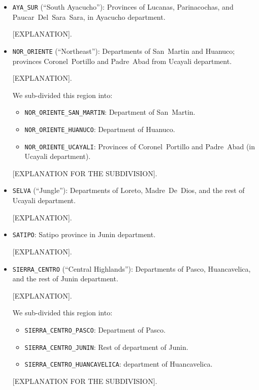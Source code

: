 \documentclass[class=article, crop=false]{standalone}
\begin{document}
\begin{itemize}
    [EXPLANATION].

  \item \texttt{AYA\_SUR} (``South Ayacucho''): Provinces of Lucanas, Parinacochas, and Paucar~Del~Sara~Sara, in Ayacucho department.

    [EXPLANATION].

  \item \texttt{NOR\_ORIENTE} (``Northeast''): Departments of San~Martin and Huanuco; provinces Coronel~Portillo and Padre~Abad from Ucayali department.

    [EXPLANATION].

    We sub-divided this region into:
    \begin{itemize}
      \item \texttt{NOR\_ORIENTE\_SAN\_MARTIN}: Department of San~Martin.
      \item \texttt{NOR\_ORIENTE\_HUANUCO}: Department of Huanuco.
      \item \texttt{NOR\_ORIENTE\_UCAYALI}: Provinces of Coronel~Portillo and Padre~Abad (in Ucayali department).
    \end{itemize}

    [EXPLANATION FOR THE SUBDIVISION].


  \item \texttt{SELVA} (``Jungle''): Departments of Loreto, Madre~De~Dios, and the rest of Ucayali department.

    [EXPLANATION].

  \item \texttt{SATIPO}: Satipo province in Junin department.

    [EXPLANATION].

  \item \texttt{SIERRA\_CENTRO} (``Central Highlands''): Departments of Pasco, Huancavelica, and the rest of Junin department.

    [EXPLANATION].

    We sub-divided this region into:
    \begin{itemize}
      \item \texttt{SIERRA\_CENTRO\_PASCO}: Department of Pasco.
      \item \texttt{SIERRA\_CENTRO\_JUNIN}: Rest of department of Junin.
      \item \texttt{SIERRA\_CENTRO\_HUANCAVELICA}: department of Huancavelica.
    \end{itemize}

    [EXPLANATION FOR THE SUBDIVISION].


\end{itemize}
\end{document}
